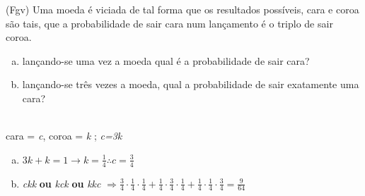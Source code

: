 \begin{ex}
(Fgv) Uma moeda é viciada de tal forma que os resultados possíveis, cara e coroa são tais, que a probabilidade de sair cara num lançamento é o triplo de sair coroa.
   \begin{enumerate}[(a)]
   \item lançando-se uma vez a moeda qual é a probabilidade de sair cara?
   \item  lançando-se três vezes a moeda, qual a probabilidade de sair exatamente uma cara?
   \end{enumerate}
     \begin{sol}
      \phantom{A}  \\
      cara = \textit{c}, coroa = \textit{k} ; \textit{c=3k}
       \begin{enumerate} [(a)]
       \item $3k+k=1 \rightarrow k = \frac{1}{4} \therefore c=\frac{3}{4}$
       \item \textit{ckk} \textbf{ou} \textit{kck} \textbf{ou} \textit{kkc} $\Longrightarrow \frac{3}{4}\cdot\frac{1}{4}\cdot\frac{1}{4}+\frac{1}{4}\cdot\frac{3}{4}\cdot\frac{1}{4}+\frac{1}{4}\cdot\frac{1}{4}\cdot\frac{3}{4}=\frac{9}{64}$
       \end{enumerate}
      
     \end{sol}
\end{ex}